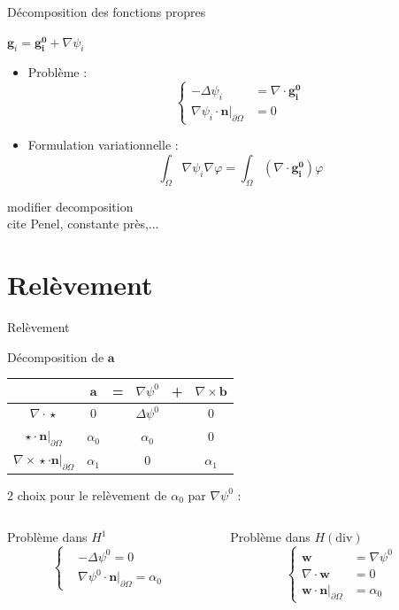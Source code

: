 \documentclass{beamer}
\newcommand{\grad}{{\nabla}}
\newcommand{\laplace}{{\Delta}}
\newcommand{\rot}{{\nabla\times}}
\renewcommand{\div}{{\nabla\cdot}}
\newcommand{\restr}{{\big\rvert_{\partial\Omega}}}
\begin{document}
\begin{frame}{Décomposition des fonctions propres}
\begin{block}{$\mathbf{g}_i=\mathbf{\mathbf{g}_i^0}+\grad\psi_i$}
\begin{itemize}
\item Problème :
\[\left\{\begin{aligned}
-\laplace\psi_i &= \div \mathbf{\mathbf{g}_i^0}\\
\grad\psi_i\cdot \mathbf{n}\restr &= 0
\end{aligned}\right.\]
\item Formulation variationnelle :
\[ \int_\Omega \grad\psi_i\grad\varphi = \int_\Omega (\div \mathbf{\mathbf{g}_i^0})\varphi \]
\end{itemize}
\end{block}
modifier decomposition\\
cite Penel, constante près,...
\end{frame}

\section{Relèvement}
\begin{frame}{Relèvement}
\label{psi0}
\begin{block}{Décomposition de $\mathbf{a}$}
\begin{center}
\begin{tabular}{c|ccccc}
& $\mathbf{a}$ & = & $\grad\psi^0$ & + & $\rot \mathbf{b}$ \\ \hline
$\div\star$ & 0 & & $\laplace\psi^0$ & & 0\\ \hline
$\star\cdot \mathbf{n}\restr$ & $\alpha_0$ & & $\alpha_0$ & & 0\\ \hline
$\rot\star\cdot \mathbf{n}\restr$ & $\alpha_1$ & & 0 & & $\alpha_1$
\end{tabular}
\end{center}
\end{block}
2 choix pour le relèvement de $\alpha_0$ par $\grad\psi^0$ :
\begin{columns}[t]
\begin{column}{5cm}
\begin{block}{Problème dans $ H^1$}
\[\left\{\begin{aligned}
&-\laplace\psi^0 = 0\\
&\grad\psi^0\cdot \mathbf{n}\restr=\alpha_0
\end{aligned}\right.\]
\end{block}
\end{column}
\begin{column}{5cm}
\begin{block}{Problème dans $ H(\mathrm{div})$}
\[\left\{\begin{aligned}
\mathbf{w} &= \grad \psi^0\\
\div \mathbf{w} &= 0\\
\mathbf{w}\cdot \mathbf{n}\restr &= \alpha_0
\end{aligned}\right.\]
\end{block}
\end{column}
\end{columns}
\end{frame}
\end{document}
